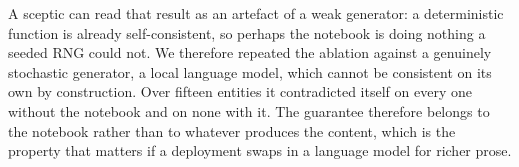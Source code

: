 A sceptic can read that result as an artefact of a weak generator: a deterministic
function is already self-consistent, so perhaps the notebook is doing nothing a
seeded RNG could not. We therefore repeated the ablation against a genuinely
stochastic generator, a local language model, which cannot be consistent on its
own by construction. Over fifteen entities it contradicted itself on every one
without the notebook and on none with it. The guarantee therefore belongs to the
notebook rather than to whatever produces the content, which is the property that
matters if a deployment swaps in a language model for richer prose.

